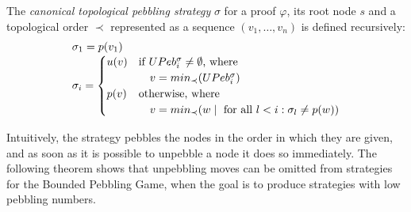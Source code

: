 \begin{definition}
\label{def:canonstrat}
The \emph{canonical topological pebbling strategy} $\sigma$ for a proof $\varphi$, its root node $s$ and a topological order $\prec$ represented as a sequence $(v_1,\dots,v_n)$ is defined recursively:
$$
\begin{array}{l}
\sigma_1 = p(v_1) \\
\sigma_i = 
	\begin{cases}
		u(v) & \text{if } UPeb^{\sigma}_{i} \neq \emptyset \text{, where} \\
				 & \quad v = min_{\prec}(UPeb^{\sigma}_{i}) \\
		p(v) & \text{otherwise, where } \\
				 & \quad v = min_{\prec}(w \mid \text{ for all } l < i: \sigma_l \neq p(w))
	\end{cases}
\end{array}
$$
\end{definition}
Intuitively, the strategy pebbles the nodes in the order in which they are given, and as soon as it is possible to unpebble a node it does so immediately.
The following theorem shows that unpebbling moves can be omitted from strategies for the Bounded Pebbling Game, when the goal is to produce strategies with low pebbling numbers.

